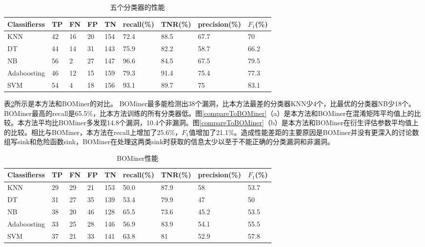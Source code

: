 {\begin{table}[ht]
\begin{center}
\caption{五个分类器的性能} \label{PERFORMANCES_OF_OUR_FIVE_CLASSIFIER_ALGORITHMS}
\begin{small}
\begin{tabular}{lllllllll}
\hline
 {\bf Classifierss}& {\bf TP} & {\bf FN} & {\bf FP} & {\bf TN} & {\bf recall(\%)} & {\bf TNR(\%)} & {\bf precision(\%)} & {\bf $F_1$(\%)}\\ \hline
KNN & 42 & 16 & 20 & 154 & 72.4 & 88.5 & 67.7 & 70\\ \hline
DT & 44 & 14 & 31 & 143 & 75.9 & 82.2 & 58.7 & 66.2\\ \hline
NB & 56 & 2 & 27 & 147 & 96.6 & 84.5 & 67.5 & 79.5\\ \hline
Adaboosting & 46 & 12 & 15 & 159 & 79.3 & 91.4 & 75.4 & 77.3\\ \hline
SVM & 54 & 4 & 18 & 156 & 93.1 & 89.7 & 75 & 83.1\\ \hline
\end{tabular}
\end{small}
\end{center}
\end{table}

表\ref{PERFORMANCE_OF_BOMINER_FOR_OUR_TEST_SUITE}所示是本方法和BOMiner的对比。
BOMiner最多能检测出38个漏洞，比本方法最差的分类器KNN少4个，比最优的分类器NB少18个。BOMiner最高的recall是65.5\%，比本方法训练的所有分类器低。图\ref{compareToBOMiner}（a）是本方法和BOMiner在混淆矩阵平均值上的比较。本方法平均比BOMiner多发现14.8个漏洞，10.4个非漏洞。图\ref{compareToBOMiner}（b）是本方法和BOMiner在衍生评估参数平均值上的比较。相比与BOMiner，本方法在recall上增加了25.6\%，$F_1$值增加了21.1\%。造成性能差距的主要原因是BOMiner并没有更深入的讨论数组写sink和危险函数sink，BOMiner在处理这两类sink时获取的信息太少以至于不能正确的分类漏洞和非漏洞。

\begin{table}[ht]
\begin{center}
\caption{BOMiner性能} \label{PERFORMANCE_OF_BOMINER_FOR_OUR_TEST_SUITE}
\begin{small}
\begin{tabular}{lllllllll}
\hline
 {\bf Classifierss}& {\bf TP} & {\bf FN} & {\bf FP} & {\bf TN} & {\bf recall(\%)} & {\bf TNR(\%)} & {\bf precision(\%)} & {\bf $F_1$(\%)}\\ \hline
KNN & 29 & 29 & 21 & 153 & 50.0 & 87.9 & 58 & 53.7\\ \hline
DT & 31 & 27 & 35 & 139 & 53.4 & 79.9 & 47 & 50\\ \hline
NB & 38 & 20 & 46 & 128 & 65.5 & 73.6 & 45.2 & 53.5\\ \hline
Adaboosting & 33 & 25 & 28 & 146 & 56.9 & 83.9 & 54.1 & 55.5\\ \hline
SVM & 37 & 21 & 33 & 141 & 63.8 & 81 & 52.9 & 57.8\\ \hline
\end{tabular}
\end{small}
\end{center}
\end{table}

}

